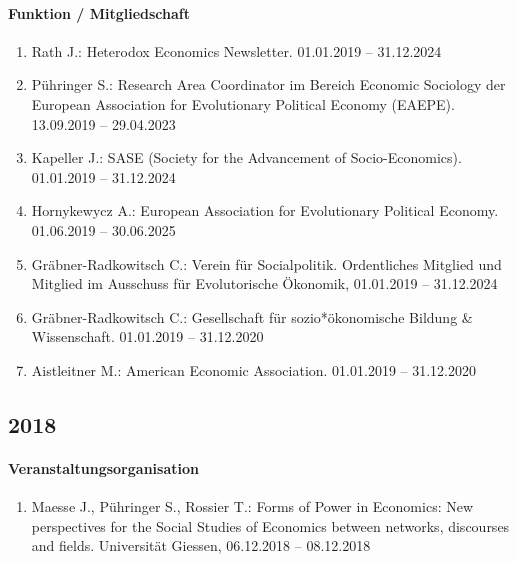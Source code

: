 \paragraph{Funktion / Mitgliedschaft}
\begin{enumerate}[leftmargin=*, labelsep=0.5cm]
\item Rath J.: Heterodox Economics Newsletter. 01.01.2019 -- 31.12.2024
\item Pühringer S.: Research Area Coordinator im Bereich \glqq Economic Sociology\grqq{} der European Association for Evolutionary Political Economy (EAEPE). 13.09.2019 -- 29.04.2023
\item Kapeller J.: SASE (Society for the Advancement of Socio-Economics). 01.01.2019 -- 31.12.2024
\item Hornykewycz A.: European Association for Evolutionary Political Economy. 01.06.2019 -- 30.06.2025
\item Gräbner-Radkowitsch C.: Verein für Socialpolitik. Ordentliches Mitglied und Mitglied im Ausschuss für Evolutorische Ökonomik, 01.01.2019 -- 31.12.2024
\item Gräbner-Radkowitsch C.: Gesellschaft für sozio*ökonomische Bildung \& Wissenschaft. 01.01.2019 -- 31.12.2020
\item Aistleitner M.: American Economic Association. 01.01.2019 -- 31.12.2020
\end{enumerate}
\subsection*{2018}
\paragraph{Veranstaltungsorganisation}
\begin{enumerate}[leftmargin=*, labelsep=0.5cm]
\item Maesse J., Pühringer S., Rossier T.: Forms of Power in Economics: New perspectives for the Social Studies of Economics between networks, discourses and fields. Universität Giessen, 06.12.2018 -- 08.12.2018
\end{enumerate}

